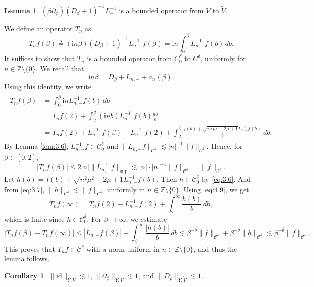 \documentclass[11pt]{article}
\makeatletter
\renewenvironment{proof}[1][\proofname]{\par
  \vspace{-.7\topsep}%
  \pushQED{\qed}%
  \normalfont
  \topsep0pt \partopsep0pt %
  \trivlist
  \item[\hskip\labelsep
        \itshape
    #1\@addpunct{.}]\ignorespaces
}{%
  \popQED\endtrivlist\@endpefalse
  \addvspace{6pt plus 6pt} %
}
\theoremstyle{definition}
\newtheorem{cor}[theorem]{Corollary}
\newtheorem{lemma}[theorem]{Lemma}
\theoremstyle{remark}
\numberwithin{equation}{section}
\newcommand{\mbb}{\mathbb}
\newcommand{\mcal}{\mathcal}
\renewcommand{\tilde}{\widetilde}
\newcommand{\Z}{\mbb{Z}}
\newcommand{\del}{\partial}
\newcommand{\abs}[1]{\left\lvert #1 \right\rvert}
\newcommand{\norm}[1]{\lVert #1 \rVert}
\makeatother
\begin{document}
\begin{lemma} \label{lem:4.5}
$(\beta \del_\phi) (D_\beta + 1)^{-1} L_-^{-1}$ is a bounded operator from $V$ to $\tilde{V}$.
\end{lemma}
\begin{proof}
We define an operator $T_n$ as
\[T_n f(\beta) \triangleq (\textrm{i}n\beta) (D_\beta + 1)^{-1} L_{n,-}^{-1} f(\beta) = \textrm{i}n \int_0^\beta L_{n,-}^{-1} f(b) \,db.\]
It suffices to show that $T_n$ is a bounded operator from $C^\delta_0$ to $C^\delta$, uniformly for $n\in\Z \setminus \{0\}$. We recall that
\[\textrm{i}n \beta = D_\beta + L_{n,-} + a_n(\beta).\]
Using this identity, we write
\begin{align} \label{eq:4.9} \begin{split}
    T_n f(\beta) &= \int_0^\beta \textrm{i}n L_{n,-}^{-1} f(b) \,db \\
    &= T_n f(2) + \int_2^\beta (\textrm{i}n b) L_{n,-}^{-1} f(b) \frac{db}{b}  \\
    &= T_n f(2) + L_{n,-}^{-1} f(\beta) - L_{n,-}^{-1} f(2) + \int_2^\beta \frac{f(b) + \sqrt{n^2 \mu^2 - 2\mu + 1} L_{n,-}^{-1} f(b)}{b} \,db.
\end{split} \end{align}
By Lemma \ref{lem:3.6}, $L_{n,-}^{-1} f \in \mcal{C}^\delta_0$ and $\norm{L_{n,-} f}_{\mcal{C}^\delta} \lesssim |n|^{-1} \norm{f}_{\mcal{C}^\delta}$. Hence, for $\beta \in [0,2]$,
\[\abs{T_n f(\beta)} \leq 2|n| \norm{L_{n,-}^{-1} f}_{\sup} \lesssim |n| \cdot |n|^{-1} \norm{f}_{\mcal{C}^\delta} = \norm{f}_{\mcal{C}^\delta}.\]
Let $h(b) = f(b) + \sqrt{n^2 \mu^2 - 2\mu + 1} L_{n,-}^{-1} f(b)$. Then $h\in \mcal{C}^\delta_0$ by \eqref{eq:3.6}. And from \eqref{eq:3.7}, $\norm{h}_{\mcal{C}^\delta} \lesssim \norm{f}_{\mcal{C}^\delta}$ uniformly in $n\in \Z\setminus\{0\}$. Using \eqref{eq:4.9}, we get
\[ T_n f(\infty) = T_n f(2) - L_{n,-}^{-1} f(2) + \int_2^\infty \frac{h(b)}{b} \,db,\]
which is finite since $h\in \mcal{C}^\delta_0$. For $\beta \to \infty$, we estimate
\[ |T_n f(\beta) - T_n f(\infty)| \leq |L_{n,-} f(\beta)| + \int_\beta^\infty \frac{|h(b)|}{b} \,db \lesssim \beta^{-\delta} \norm{f}_{\mcal{C}^\delta} + \beta^{-\delta} \norm{h}_{\mcal{C}^\delta} \lesssim \beta^{-\delta} \norm{f}_{\mcal{C}^\delta}.\]
This proves that $T_n f \in \mcal{C}^\delta$ with a norm uniform in $n \in \mbb{Z}\setminus\{0\}$, and thus the lemma follows.
\end{proof}
\begin{cor} \label{cor:4.6}
$\norm{\text{id}}_{Y, V} \lesssim 1$, $\norm{\del_\phi}_{Y, V} \lesssim 1$, and $\norm{D_\rho}_{Y, \tilde{V}} \lesssim 1$.
\end{cor}
\end{document}
